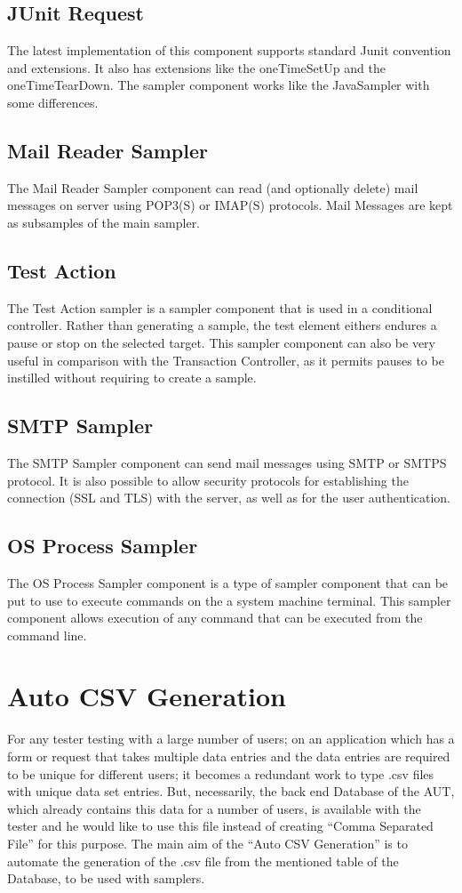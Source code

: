 \documentclass[12pt]{book}
\begin{document}
  \subsection{JUnit Request}
  The latest implementation of this component supports standard Junit convention and extensions. It also has extensions like the
  oneTimeSetUp and the oneTimeTearDown. The sampler component works like the JavaSampler with some differences.
  
  \subsection{Mail Reader Sampler}
  The Mail Reader Sampler component can read (and optionally delete) mail messages on server using POP3(S) or IMAP(S) protocols. 
  Mail Messages are kept as subsamples of the main sampler.
  
  \subsection{Test Action}
  The Test Action sampler is a sampler component that is used in a conditional controller. Rather than generating a sample, the test
  element eithers endures a pause or stop on the selected target. This sampler component can also be very useful in comparison with the 
  Transaction Controller, as it permits pauses to be instilled without requiring to create a sample.
  
  \subsection{SMTP Sampler}
  The SMTP Sampler component can send mail messages using SMTP or SMTPS protocol. It is also possible to allow security protocols 
  for establishing the connection (SSL and TLS) with the server, as well as for the user authentication.
  
  \subsection{OS Process Sampler}
  The OS Process Sampler component is a type of sampler component that can be put to use to execute commands on the a 
  system machine terminal. This sampler component allows execution of any command that can be executed from the command line.
  
\section{Auto CSV Generation}
For any tester testing with a large number of users; on an application which has a form or
request that takes multiple data entries and the data entries are required to be unique for different
users; it becomes a redundant work to type .csv files with unique data set entries. But,
necessarily, the back end Database of the AUT, which already contains this data for a number of
users, is available with the tester and he would like to use this file instead of creating ``Comma
Separated File'' for this purpose. The main aim of the ``Auto CSV Generation'' is to automate the
generation of the .csv file from the mentioned table of the Database, to be used with samplers.\\
\end{document}
